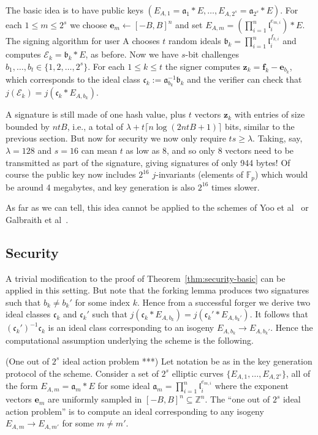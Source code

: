 \documentclass{llncs}
\newcommand{\E}{\mathcal{E}}
\newcommand{\F}{\mathbb{F}}
\newcommand{\Z}{\mathbb{Z}}
\renewcommand{\a}{\mathfrak{a}}
\renewcommand{\b}{\mathfrak{b}}
\renewcommand{\c}{\mathfrak{c}}
\renewcommand{\l}{\mathfrak{l}}
\newcommand{\e}{\mathbf{e}}
\newcommand{\f}{\mathbf{f}}
\newcommand{\z}{\mathbf{z}}
\begin{document}
The basic idea is to have public keys $( E_{A,1} = \a_1 * E , \dots , E_{A,2^s} = \a_{2^s} * E )$.
For each $1 \le m \le 2^s$ we choose $\e_m \leftarrow [-B,B]^n$ and set $E_{A,m} = ( \prod_{i=1}^n \l_i^{e_{m,i}} ) * E$.
The signing algorithm for user A chooses $t$ random ideals $\b_k = \prod_{i=1}^n \l_i^{f_{k,i}}$ and computes $\E_k = \b_k * E$, as before.
Now we have $s$-bit challenges $b_1, \dots, b_t \in \{1, 2, \dots, 2^s \}$.
For each $1 \le k \le t$ the signer computes $\z_k = \f_k - \e_{b_k}$, which corresponds to the ideal class $\c_k := \a_{b_k}^{-1} \b_k$ and the verifier can check that $j( \E_k ) = j( \c_k * E_{A, b_k})$.

A signature is still made of one hash value, plus $t$ vectors $\z_k$ with entries of size bounded by $ntB$, i.e., a total of $\lambda + t\lceil n\log(2ntB + 1)\rceil$ bits, similar to the previous section.
But now for security we now only require $ts \ge \lambda$.
Taking, say, $\lambda = 128$ and $s = 16$ can mean $t$ as low as 8, and so only 8 vectors need to be transmitted as part of the signature, giving signatures of only 944 bytes!
Of course the public key now includes $2^{16}$ $j$-invariants (elements of $\F_p$) which would be around 4 megabytes, and key generation is also $2^{16}$ times slower.


As far as we can tell, this idea cannot be applied to the schemes of Yoo et al~\cite{YAJJS17} or Galbraith et al~\cite{GPS17}.



\subsection{Security}

A trivial modification to the proof of Theorem~\ref{thm:security-basic} can be applied in this setting. But note that the forking lemma produces two signatures such that $b_k \ne b_k'$ for some index $k$.
Hence from a successful forger we derive two ideal classes $\c_k$ and $\c_k'$ such that $j( \c_k * E_{A, b_k} ) = j( \c_k' * E_{A, b_k'})$. It follows that $(\c_k')^{-1} \c_k$ is an ideal class corresponding to an isogeny $E_{A,b_k} \to E_{A,b_k'}$.
Hence the computational assumption underlying the scheme is the following.

\begin{definition}\label{defn:one-out-of-2s-problem}
(One out of $2^s$ ideal action problem ***)
Let notation be as in the key generation protocol of the scheme.
Consider a set of $2^s$ elliptic curves $\{ E_{A,1}, \dots, E_{A,2^s} \}$, all of the form $E_{A,m} = \a_m * E$ for some ideal $\a_m = \prod_{i=1}^n \l_i^{e_{m,i}}$ where the exponent vectors $\e_m $ are uniformly sampled in $[-B,B]^n \subseteq \Z^n$. The ``one out of $2^s$ ideal action problem'' is to compute an ideal corresponding to any isogeny $E_{A,m} \to E_{A,m'}$ for some $m \ne m'$.
\end{definition}
\end{document}
